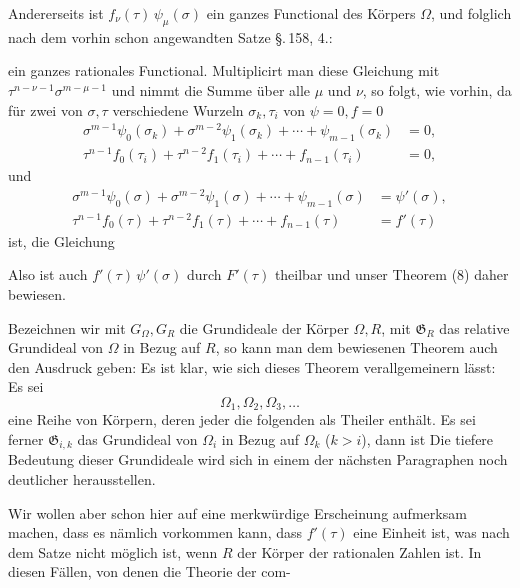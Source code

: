 Andererseits ist $f_\nu(\tau)\,\psi_\mu(\sigma)$ ein ganzes Functional des Körpers
$\Omega$, und folglich nach dem vorhin schon angewandten Satze \S.\,158, 4.:

ein ganzes rationales Functional. Multiplicirt man diese Gleichung mit
$\tau^{n-\nu-1}\sigma^{m-\mu-1}$ und nimmt die Summe über alle $\mu$ und $\nu$, so folgt,
wie vorhin, da für zwei von $\sigma, \tau$ verschiedene Wurzeln $\sigma_k, \tau_i$ von
$\psi=0, f=0$
\[
\begin{aligned}
\sigma^{m-1}\psi_0(\sigma_k) + \sigma^{m-2}\psi_1(\sigma_k) + \cdots + \psi_{m-1}(\sigma_k) &= 0,\\
\tau^{n-1} f_0(\tau_i) + \tau^{n-2} f_1(\tau_i) + \cdots + f_{n-1}(\tau_i) &= 0,
\end{aligned}
\]
und
\[
\begin{aligned}
\sigma^{m-1}\psi_0(\sigma) + \sigma^{m-2}\psi_1(\sigma) + \cdots + \psi_{m-1}(\sigma) &= \psi'(\sigma),\\
\tau^{n-1} f_0(\tau) + \tau^{n-2} f_1(\tau) + \cdots + f_{n-1}(\tau) &= f'(\tau)
\end{aligned}
\]
ist, die Gleichung

Also ist auch $f'(\tau)\,\psi'(\sigma)$ durch $F'(\tau)$ theilbar und unser Theorem (8)
daher bewiesen.

Bezeichnen wir mit $G_\Omega, G_R$ die Grundideale der Körper $\Omega, R$, mit
$\mathfrak{G}_R$ das relative Grundideal von $\Omega$ in Bezug auf $R$, so kann man dem
bewiesenen Theorem auch den Ausdruck geben:
Es ist klar, wie sich dieses Theorem verallgemeinern lässt: Es sei
\[
\Omega_1, \Omega_2, \Omega_3, \ldots
\]
eine Reihe von Körpern, deren jeder die folgenden als Theiler enthält. Es sei ferner
$\mathfrak{G}_{i,k}$ das Grundideal von $\Omega_i$ in Bezug auf $\Omega_k$ ($k > i$),
dann ist
Die tiefere Bedeutung dieser Grundideale wird sich in einem der nächsten Paragraphen noch
deutlicher herausstellen.

Wir wollen aber schon hier auf eine merkwürdige Erscheinung aufmerksam machen, dass es
nämlich vorkommen kann, dass $f'(\tau)$ eine Einheit ist, was nach dem
 Satze nicht möglich ist, wenn $R$ der Körper der rationalen
Zahlen ist. In diesen Fällen, von denen die Theorie der com-
